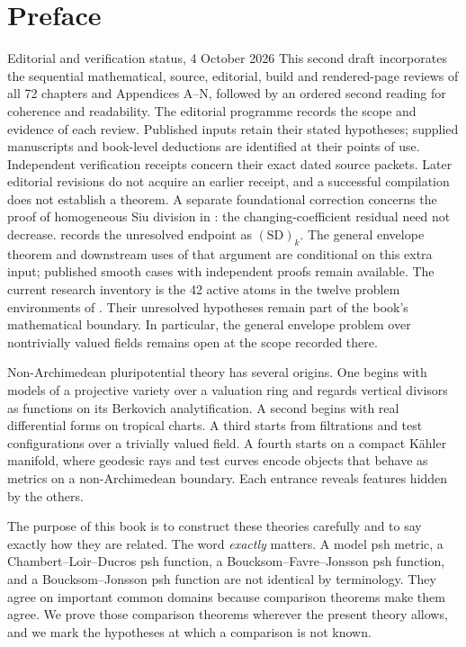 \chapter*{Preface}
\label{front:preface}

\begin{warning}{Editorial and verification status, 4 October 2026}
\label{warn:front-verification-status}
This second draft incorporates the sequential mathematical, source,
editorial, build and rendered-page reviews of all 72 chapters and
Appendices A--N, followed by an ordered second reading for coherence
and readability. The editorial programme records the scope and evidence
of each review. Published inputs retain their stated hypotheses;
supplied manuscripts and book-level deductions are identified at their
points of use. Independent verification receipts concern their exact
dated source packets. Later editorial revisions do not acquire an earlier
receipt, and a successful compilation does not establish a theorem.
A separate foundational correction concerns the proof of homogeneous Siu
division in \cite[Theorem~6.21]{BJ22}: the changing-coefficient residual
need not decrease.  records the unresolved
endpoint as $\mathrm{(SD)}_k$. The general envelope theorem and downstream
uses of that argument are conditional on this extra input; published
smooth cases with independent proofs remain available.
The current research inventory is the 42 active atoms in the twelve
problem environments of . Their unresolved
hypotheses remain part of the book's mathematical boundary. In particular,
the general envelope problem over nontrivially valued fields remains open
at the scope recorded there.
\end{warning}

Non-Archimedean pluripotential theory has several origins.  One begins with
models of a projective variety over a valuation ring and regards vertical
divisors as functions on its Berkovich analytification.  A second begins with
real differential forms on tropical charts.  A third starts from filtrations
and test configurations over a trivially valued field.  A fourth starts on a
compact Kähler manifold, where geodesic rays and test curves encode objects
that behave as metrics on a non-Archimedean boundary.  Each entrance reveals
features hidden by the others.

The purpose of this book is to construct these theories carefully and to say
exactly how they are related.  The word \emph{exactly} matters.  A model psh
metric, a Chambert--Loir--Ducros psh function, a Boucksom--Favre--Jonsson psh
function, and a Boucksom--Jonsson psh function are not identical
by terminology.  They agree on important common domains because comparison
theorems make them agree.  We prove those comparison theorems wherever the
present theory allows, and we mark the hypotheses at which a comparison is
not known.

